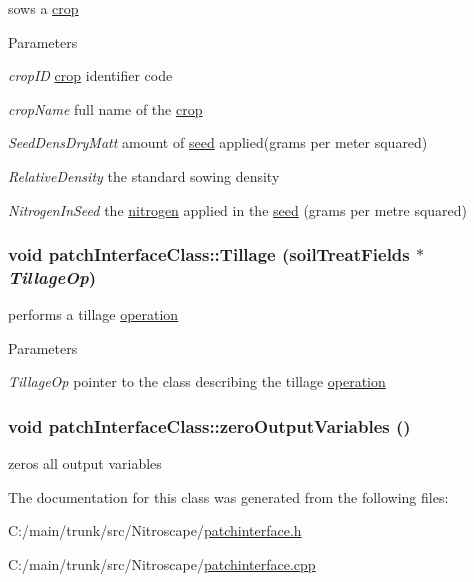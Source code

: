sows a \hyperlink{classcrop}{crop} 
\begin{DoxyParams}{Parameters}
\item[{\em cropID}]\hyperlink{classcrop}{crop} identifier code \item[{\em cropName}]full name of the \hyperlink{classcrop}{crop} \item[{\em SeedDensDryMatt}]amount of \hyperlink{classseed}{seed} applied(grams per meter squared) \item[{\em RelativeDensity}]the standard sowing density \item[{\em NitrogenInSeed}]the \hyperlink{classnitrogen}{nitrogen} applied in the \hyperlink{classseed}{seed} (grams per metre squared) \end{DoxyParams}
\hypertarget{classpatch_interface_class_aa66072c455d76167fca0bc714f870997}{
\subsubsection[{Tillage}]{\setlength{\rightskip}{0pt plus 5cm}void patchInterfaceClass::Tillage ({\bf soilTreatFields} $\ast$ {\em TillageOp})}}
\label{classpatch_interface_class_aa66072c455d76167fca0bc714f870997}


performs a tillage \hyperlink{classoperation}{operation} 
\begin{DoxyParams}{Parameters}
\item[{\em TillageOp}]pointer to the class describing the tillage \hyperlink{classoperation}{operation} \end{DoxyParams}
\hypertarget{classpatch_interface_class_a5ba5cbe194b9e76f7dab382e1504be39}{
\subsubsection[{zeroOutputVariables}]{\setlength{\rightskip}{0pt plus 5cm}void patchInterfaceClass::zeroOutputVariables ()}}
\label{classpatch_interface_class_a5ba5cbe194b9e76f7dab382e1504be39}


zeros all output variables 

The documentation for this class was generated from the following files:\begin{DoxyCompactItemize}
\item 
C:/main/trunk/src/Nitroscape/\hyperlink{patchinterface_8h}{patchinterface.h}\item 
C:/main/trunk/src/Nitroscape/\hyperlink{patchinterface_8cpp}{patchinterface.cpp}\end{DoxyCompactItemize}
